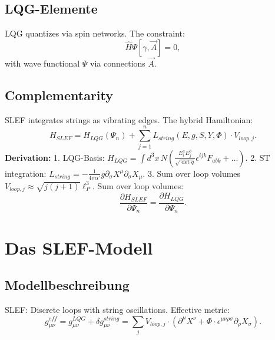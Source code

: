 \documentclass[11pt,a4paper]{article}
\begin{document}
	\subsection{LQG-Elemente}
	LQG quantizes via spin networks. The constraint:
	\begin{equation}
		\hat{H} \Psi[\gamma, \vec{A}] = 0,
	\end{equation}
	with wave functional $\Psi$ via connections $\vec{A}$.
	
	\subsection{Complementarity}
	SLEF integrates strings as vibrating edges. The hybrid Hamiltonian:
	\begin{equation}
		H_{SLEF} = H_{LQG}(\Psi_n) + \sum_{j=1}^n L_{string}(E, g, S, Y, \Phi) \cdot V_{loop,j}.
	\end{equation}
	\textbf{Derivation:}  
	1. LQG-Basis: $H_{LQG} = \int d^3x \, N \left( \frac{E_i^a E_j^b}{\sqrt{\det q}} \epsilon^{ijk} F_{abk} + \dots \right)$.  
	2. ST integration: $L_{string} = -\frac{1}{4\pi\alpha'} g \partial_\sigma X^\mu \partial_\sigma X_\mu$.  
	3. Sum over loop volumes $V_{loop,j} \approx \sqrt{j(j+1)} \ell_P^3$.  
	Sum over loop volumes:  
	\begin{equation}
		\frac{\partial H_{SLEF}}{\partial \Psi_n} = \frac{\partial H_{LQG}}{\partial \Psi_n}.
	\end{equation}
	
	\section{Das SLEF-Modell}
	
	\subsection{Modellbeschreibung}
	SLEF: Discrete loops with string oscillations. Effective metric:
	\begin{equation}
		g_{\mu\nu}^{eff} = g_{\mu\nu}^{LQG} + \delta g_{\mu\nu}^{string} = \sum_j V_{loop,j} \cdot \left( \partial^\mu X^\nu + \Phi \cdot \epsilon^{\mu\nu\rho\sigma} \partial_\rho X_\sigma \right).
	\end{equation}
	
\end{document}
